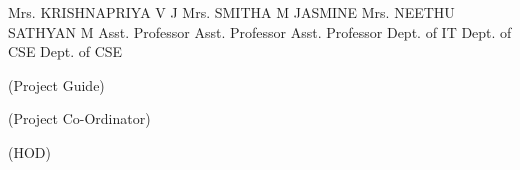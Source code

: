 \begin{titlepage}
		\begin{FlushLeft}
			\begin{footnotesize}
				Mrs. KRISHNAPRIYA V J\hspace{0.55cm}
				Mrs. SMITHA M JASMINE\hspace{0.45cm}
				Mrs. NEETHU SATHYAN M \newline
				Asst. Professor\hspace{2.5cm}	
				Asst. Professor\hspace{2.55cm}
				Asst. Professor\newline
				Dept. of IT\hspace{3.1cm}
				Dept. of CSE\hspace{2.75cm}
				Dept. of CSE\newline
				\begin{scriptsize}
					(Project Guide)
				\end{scriptsize}\hspace{2.6cm}
				\begin{scriptsize}
					(Project Co-Ordinator)
				\end{scriptsize}\hspace{1.7cm}
				(HOD)\newline
				
				
			\end{footnotesize}
		\end{FlushLeft}
		

	

\end{titlepage}


